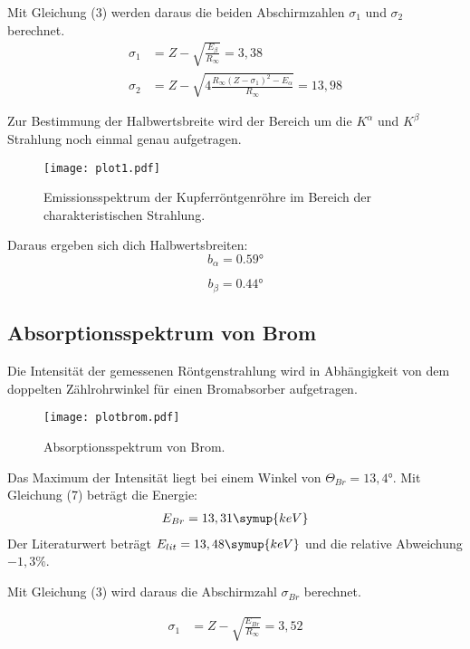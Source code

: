 Mit Gleichung (3) werden daraus die beiden Abschirmzahlen $\sigma_1$ und $\sigma_2$ berechnet.
\begin{align*}
  \sigma_1 &= Z - \sqrt{\frac{E_{\beta}}{R_{\infty}}} = 3,38 \\
  \sigma_2 &= Z - \sqrt{4 \frac{R_{\infty} (Z-\sigma_1)^2 - E_{\alpha}}{R_{\infty}}} = 13,98
\end{align*}

Zur Bestimmung der Halbwertsbreite wird der Bereich um die $K^{\alpha}$ und $K^{\beta}$ Strahlung
noch einmal genau aufgetragen.

\begin{figure}
  \centering
  \texttt{[image: plot1.pdf]}
  \caption{Emissionsspektrum der Kupferröntgenröhre im Bereich der charakteristischen Strahlung.}
  \label{fig:plot1}
\end{figure}

Daraus ergeben sich dich Halbwertsbreiten:
\begin{equation*}
  b_{\alpha} = 0.59°
\end{equation*}

\begin{equation*}
  b_{\beta} = 0.44°
\end{equation*}


\subsection{Absorptionsspektrum von Brom}

Die Intensität der gemessenen Röntgenstrahlung wird in Abhängigkeit von dem doppelten Zählrohrwinkel für
einen Bromabsorber aufgetragen.

\begin{figure}[H]
  \centering
  \texttt{[image: plotbrom.pdf]}
  \caption{Absorptionsspektrum von Brom.}
  \label{fig:plot}
\end{figure}

Das Maximum der Intensität liegt bei einem Winkel von $\Theta_{Br} = 13,4°$.
Mit Gleichung (7) beträgt die Energie:
\begin{align*}
  E_{Br} = 13,31 \symup{keV}
\end{align*}
Der Literaturwert beträgt $E_{lit} = 13,48 \symup{keV}$ und die relative Abweichung $-1,3\%$.

Mit Gleichung (3) wird daraus die Abschirmzahl $\sigma_{Br}$  berechnet.

\begin{align*}
  \sigma_1 &= Z - \sqrt{\frac{E_{Br}}{R_{\infty}}} = 3,52 \\
\end{align*}

